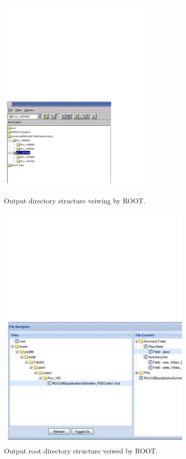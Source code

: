 \begin{figure}
\begin{minipage}[htbp]{0.37\linewidth} %
\centering
\includegraphics[width=7.5cm]{directory.pdf}
\caption{Output directory structure veiwing by ROOT.}
\label{fig:directory}
\end{minipage}
\hspace{0.5cm}
\begin{minipage}[htbp]{0.57\linewidth}
\centering
\includegraphics[width=9.5cm]{ROCUB_directory.pdf}
\caption{Output root directory structure veiwed by ROOT.}
\label{rootdirectory}
\end{minipage}
\end{figure}

